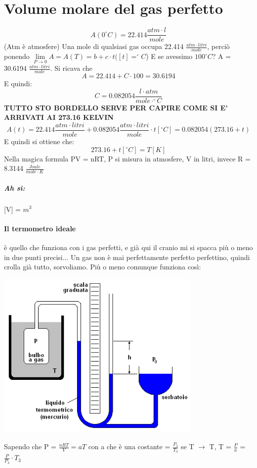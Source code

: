 \documentclass[12pt, a4paper, openany, oneside]{book}
\begin{document}
\section{Volume molare del gas perfetto}
\[A(0^{\circ}C) = 22.414 \frac{atm \cdot l}{mole}\]
(Atm è atmosfere)
Una mole di qualsiasi gas occupa 22.414 $\frac{atm \cdot litri}{mole}$, 
perciò ponendo $\lim \limits_{P \to 0} A = A(T) = b+c\cdot t ([t] = ^{\circ}C$)
E se avessimo $100^{\circ}C$? A = 30.6194 $\frac{atm \cdot litri}{mole}$.
Si ricava che
\[
A = 22.414 + C \cdot 100 = 30.6194
\]	
E quindi: 
\[
C = 0.082054 \frac{l\cdot atm}{mole \cdot ^{\circ}C}
\]	
\textbf{TUTTO STO BORDELLO SERVE PER CAPIRE COME SI E' ARRIVATI AI 273.16 KELVIN}
\[
A(t) = 22.414 \frac{atm \cdot litri}{mole} + 0.082054 \frac{atm \cdot litri}{mole}
\cdot t[^{\circ}C] = 0.082054 (273.16 + t)
\]	
E quindi si ottiene che:
\[
273.16 + t [^{\circ}C] = T [K]
\]	
Nella magica formula PV = nRT, P si misura in atmosfere, V in litri, invece R =
8.3144 $\frac{Joule}{mole\cdot K}$ 
\subparagraph{Ah sì: }[V] = $m^{3}$	
\paragraph{Il termometro ideale} è quello che funziona con i gas perfetti, e già
qui il cranio mi si spacca più o meno in due punti precisi... Un gas non è mai
perfettamente perfetto perfettino, quindi crolla già tutto, sorvoliamo. 
Più o meno comunque funziona così:
\begin{center}
\includegraphics[width=0.75\textwidth]{15}
\end{center}
Sapendo che P = $\frac{nRT}{V} = aT$ con a che è una costante = $\frac{P_3}{T_{3}}$
se T $\to$ T, T = $\frac{P}{a}$ = $\frac{P}{P_{3}} \cdot T_{3}$
\end{document}
